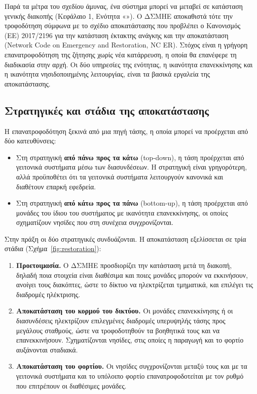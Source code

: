 Παρά τα μέτρα του σχεδίου άμυνας, ένα σύστημα μπορεί να μεταβεί σε κατάσταση γενικής διακοπής
(Κεφάλαιο 1, Ενότητα «»). Ο ΔΣΜΗΕ αποκαθιστά τότε την τροφοδότηση σύμφωνα με
το σχέδιο αποκατάστασης που προβλέπει ο Κανονισμός (ΕΕ) 2017/2196 για την κατάσταση έκτακτης
ανάγκης και την αποκατάσταση (Network Code on Emergency and Restoration, NC ER). Στόχος είναι η
γρήγορη επανατροφοδότηση της ζήτησης χωρίς νέα κατάρρευση, η οποία θα επανέφερε τη διαδικασία
στην αρχή. Οι δύο υπηρεσίες της ενότητας, η ικανότητα επανεκκίνησης και η ικανότητα
νησιδοποιημένης λειτουργίας, είναι τα βασικά εργαλεία της αποκατάστασης.

\subsection{Στρατηγικές και στάδια της αποκατάστασης}
\label{sec:restoration-stages}

Η επανατροφοδότηση ξεκινά από μια πηγή τάσης, η οποία μπορεί να προέρχεται από δύο κατευθύνσεις:

\begin{itemize}
\item Στη στρατηγική \textbf{από πάνω προς τα κάτω} (top-down), η τάση προέρχεται από γειτονικά
      συστήματα μέσω των διασυνδέσεων. Η στρατηγική είναι γρηγορότερη, αλλά προϋποθέτει ότι τα
      γειτονικά συστήματα λειτουργούν κανονικά και διαθέτουν επαρκή εφεδρεία.
\item Στη στρατηγική \textbf{από κάτω προς τα πάνω} (bottom-up), η τάση προέρχεται από μονάδες
      του ίδιου του συστήματος με ικανότητα επανεκκίνησης, οι οποίες σχηματίζουν νησίδες που
      στη συνέχεια συγχρονίζονται.
\end{itemize}

Στην πράξη οι δύο στρατηγικές συνδυάζονται. Η αποκατάσταση εξελίσσεται σε τρία στάδια
(Σχήμα~\ref{fig:restoration}):

\begin{enumerate}
\item \textbf{Προετοιμασία.} Ο ΔΣΜΗΕ προσδιορίζει την κατάσταση μετά τη διακοπή, δηλαδή ποια
      στοιχεία είναι διαθέσιμα και ποιες μονάδες μπορούν να εκκινήσουν, ανοίγει τους
      διακόπτες, ώστε το δίκτυο να ηλεκτρίζεται τμηματικά, και επιλέγει τις διαδρομές
      ηλέκτρισης.
\item \textbf{Αποκατάσταση του κορμού του δικτύου.} Οι μονάδες επανεκκίνησης ή οι διασυνδέσεις
      ηλεκτρίζουν επιλεγμένες διαδρομές υπερυψηλής τάσης προς μεγάλους σταθμούς, ώστε να
      τροφοδοτηθούν τα βοηθητικά τους και να επανεκκινήσουν. Σχηματίζονται νησίδες, στις οποίες
      η παραγωγή και το φορτίο αυξάνονται σταδιακά.
\item \textbf{Αποκατάσταση του φορτίου.} Οι νησίδες συγχρονίζονται μεταξύ τους και με τα
      γειτονικά συστήματα και το υπόλοιπο φορτίο επανατροφοδοτείται με τον ρυθμό που
      επιτρέπουν οι διαθέσιμες μονάδες.
\end{enumerate}

